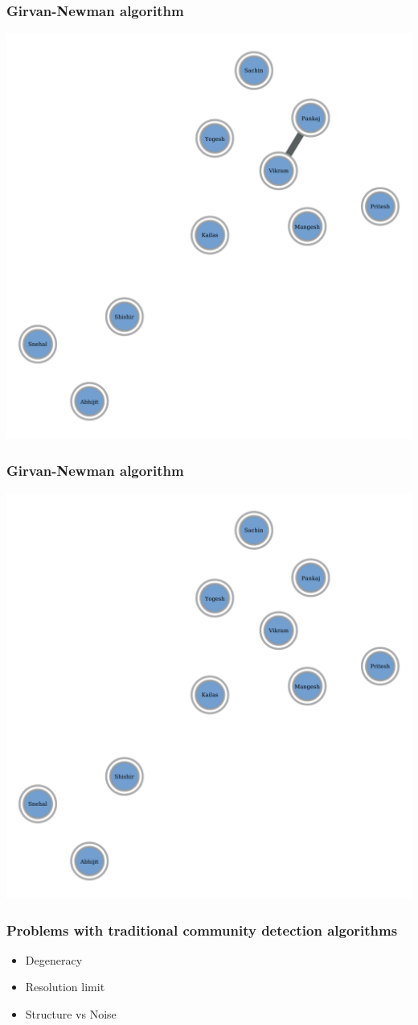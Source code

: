 \documentclass{beamer}
\begin{document}
\begin{frame}
    \frametitle{Girvan-Newman algorithm}
    \centering
    \includegraphics[width=0.8\columnwidth]{gn16.pdf}
\end{frame}
\begin{frame}
    \frametitle{Girvan-Newman algorithm}
    \centering
    \includegraphics[width=0.8\columnwidth]{gn17.pdf}
\end{frame}
\begin{frame}
    \frametitle{Problems with traditional community detection algorithms}
    \centering

    \begin{itemize}
        \setlength\itemsep{1em}
        \item{Degeneracy}
        \item{Resolution limit}
        \item{Structure vs Noise}
    \end{itemize}
\end{frame}
\end{document}
